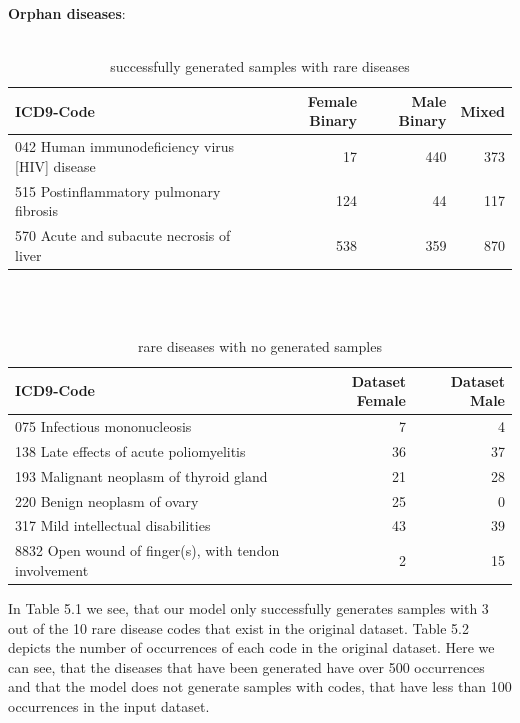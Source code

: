\documentclass[11pt, a4paper]{book}
\begin{document}
\textbf{Orphan diseases}:
\\
\\
\begin{table}
\begin{tabular}{l|r|r|r}
ICD9-Code & Female Binary & Male Binary & Mixed\\
\hline
042 Human immunodeficiency virus [HIV] disease	& 17 & 440 & 373\\
515 Postinflammatory pulmonary fibrosis & 124 & 44 & 117\\
570 Acute and subacute necrosis of liver & 538	& 359 & 870\\
\end{tabular}
\caption{\label{tab:rare-generataed}successfully generated samples with rare diseases}
\end{table}
\\
\\
\begin{table}
\begin{tabular}{l|r|r}
ICD9-Code & Dataset Female & Dataset Male\\
\hline
075 Infectious mononucleosis & 7 & 4\\
138 Late effects of acute poliomyelitis & 36 & 37 \\
193 Malignant neoplasm of thyroid gland & 21 & 28 \\
220 Benign neoplasm of ovary & 25	& 0\\
317 Mild intellectual disabilities & 43 & 39\\
8832 Open wound of finger(s), with tendon involvement & 2 & 15\\ 
\end{tabular}
\caption{\label{tab:rare-not-generated}rare diseases with no generated samples}
\end{table}

In Table 5.1 we see, that our model only successfully generates samples with 3 out of the 10 rare disease codes that exist in the original dataset.
Table 5.2 depicts the number of occurrences of each code in the original dataset. Here we can see, that the diseases that have been generated have over 500 occurrences and that the model  does not generate samples with codes, that have less than 100 occurrences in the input dataset.
\end{document}
